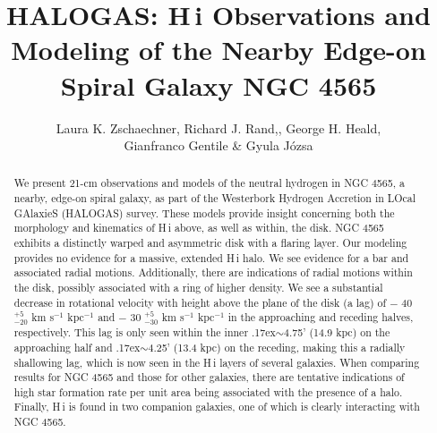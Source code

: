 \documentclass{emulateapj}
\begin{document}
\title{HALOGAS: {\sc H\,i} Observations and Modeling of the Nearby Edge-on Spiral Galaxy NGC 4565} 
\author{\sc Laura K. Zschaechner, Richard J. Rand,, George H. Heald,\\ Gianfranco Gentile  \& Gyula J\'{o}zsa }
\begin{abstract}

\par
     We present 21-cm observations and models of the neutral hydrogen in NGC 4565, a nearby, edge-on spiral galaxy, as part of the Westerbork Hydrogen Accretion in LOcal GAlaxieS (HALOGAS) survey.  These models provide insight concerning both the morphology and kinematics of {\sc H\,i} above, as well as within, the disk.  NGC 4565 exhibits a distinctly warped and asymmetric disk with a flaring layer.  Our modeling provides no evidence for a massive, extended {\sc H\,i} halo.  We see evidence for a bar and associated radial motions.  Additionally, there are indications of radial motions within the disk, possibly associated with a ring of higher density.  We see a substantial decrease in rotational velocity with height above the plane of the disk (a lag) of $-$ 40 $^{+5}_{-20}$ km s$^{-1}$ kpc$^{-1}$  and $-$ 30 $^{+5}_{-30}$ km s$^{-1}$ kpc$^{-1}$ in the approaching and receding halves, respectively.  This lag is only seen within the inner {\raise.17ex\hbox{$\scriptstyle\sim$}}4.75' (14.9 kpc) on the approaching half and {\raise.17ex\hbox{$\scriptstyle\sim$}}4.25' (13.4 kpc) on the receding, making this a radially shallowing lag, which is now seen in the {\sc H\,i} layers of several galaxies.  When comparing results for NGC 4565 and those for other galaxies, there are tentative indications of high star formation rate per unit area being associated with the presence of a halo. Finally, {\sc H\,i} is found in two companion galaxies, one of which is clearly interacting with NGC 4565.

\end{abstract}
\end{document}
